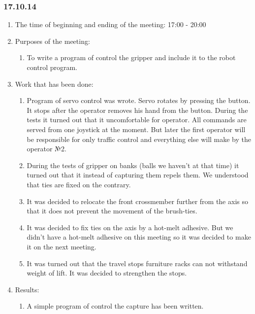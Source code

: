 
\subsubsection{17.10.14}

\begin{enumerate}
	\item The time of beginning and ending of the meeting:
	17:00 - 20:00
	\item Purposes of the meeting:
	\begin{enumerate}
	  \item To write a program of control the gripper and include it to the robot control program.
	  
    \end{enumerate}
    
	\item Work that has been done:
	\begin{enumerate}
	  \item Program of servo control was wrote. Servo rotates by pressing the button. It stops after the operator removes his hand from the button. During the tests it turned out that it uncomfortable for operator. All commands are served from one joystick at the moment. But later the first operator will be responsible for only traffic control and everything else will make by the operator №2.
      
      \item During the tests of gripper on banks (balls we haven't at that time) it turned out that it instead of capturing them repels them. We understood that ties are fixed on the contrary.
      
      \item It was decided to relocate the front crossmember further from the axis so that it does not prevent the movement of the brush-ties.
      
      \item It was decided to fix ties on the axis by a hot-melt adhesive. But we didn't have a hot-melt adhesive on this meeting so it was decided to make it on the next meeting.
      
      \item It was turned out that the travel stops furniture racks can not withstand weight of lift. It was decided to strengthen the stops.
      
    \end{enumerate}
    
	\item Results: 
	\begin{enumerate}
	  \item A simple program of control the capture has been written.
	  

\end{enumerate}
\end{enumerate}
